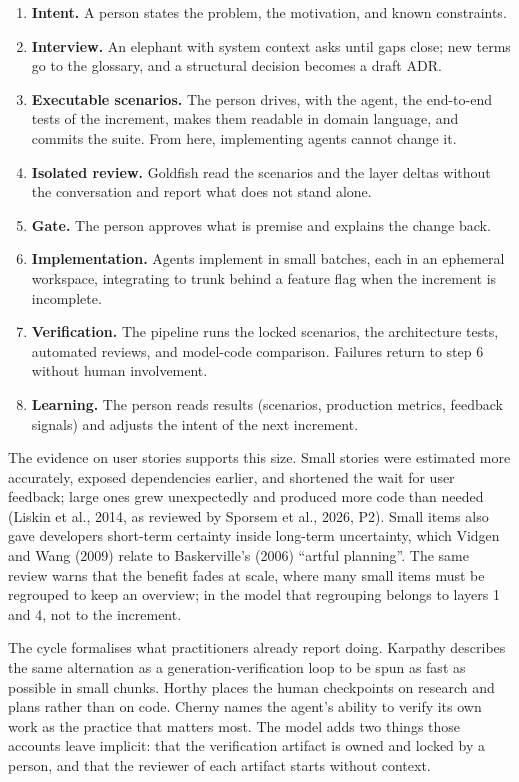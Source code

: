\documentclass[11pt]{article}
\begin{document}
\begin{enumerate}[leftmargin=*]
  \item \textbf{Intent.} A person states the problem, the motivation, and known constraints.
  \item \textbf{Interview.} An elephant with system context asks until gaps close; new terms go to the glossary, and a structural decision becomes a draft ADR.
  \item \textbf{Executable scenarios.} The person drives, with the agent, the end-to-end tests of the increment, makes them readable in domain language, and commits the suite. From here, implementing agents cannot change it.
  \item \textbf{Isolated review.} Goldfish read the scenarios and the layer deltas without the conversation and report what does not stand alone.
  \item \textbf{Gate.} The person approves what is premise and explains the change back.
  \item \textbf{Implementation.} Agents implement in small batches, each in an ephemeral workspace, integrating to trunk behind a feature flag when the increment is incomplete.
  \item \textbf{Verification.} The pipeline runs the locked scenarios, the architecture tests, automated reviews, and model-code comparison. Failures return to step 6 without human involvement.
  \item \textbf{Learning.} The person reads results (scenarios, production metrics, feedback signals) and adjusts the intent of the next increment.
\end{enumerate}

The evidence on user stories supports this size. Small stories were estimated more accurately, exposed dependencies earlier, and shortened the wait for user feedback; large ones grew unexpectedly and produced more code than needed (Liskin et al., 2014, as reviewed by Sporsem et al., 2026, P2). Small items also gave developers short-term certainty inside long-term uncertainty, which Vidgen and Wang (2009) relate to Baskerville's (2006) ``artful planning''. The same review warns that the benefit fades at scale, where many small items must be regrouped to keep an overview; in the model that regrouping belongs to layers 1 and 4, not to the increment.

The cycle formalises what practitioners already report doing. Karpathy describes the same alternation as a generation-verification loop to be spun as fast as possible in small chunks. Horthy places the human checkpoints on research and plans rather than on code. Cherny names the agent's ability to verify its own work as the practice that matters most. The model adds two things those accounts leave implicit: that the verification artifact is owned and locked by a person, and that the reviewer of each artifact starts without context.
\end{document}
